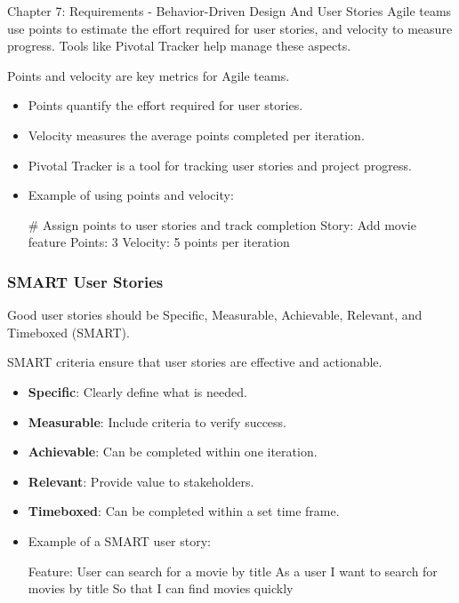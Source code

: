 \begin{notes}{Chapter 7: Requirements - Behavior-Driven Design And User Stories}
    Agile teams use points to estimate the effort required for user stories, and velocity to measure progress. Tools like Pivotal Tracker help manage these aspects.
    
    \begin{highlight}
    
        Points and velocity are key metrics for Agile teams.
        
        \begin{itemize}
            \item Points quantify the effort required for user stories.
            \item Velocity measures the average points completed per iteration.
            \item Pivotal Tracker is a tool for tracking user stories and project progress.
            \item Example of using points and velocity:
    \begin{code}[Bash]
    # Assign points to user stories and track completion
    Story: Add movie feature
    Points: 3
    Velocity: 5 points per iteration
    \end{code}
        \end{itemize}
    
    \end{highlight}
    
    \subsubsection*{SMART User Stories}
    
    Good user stories should be Specific, Measurable, Achievable, Relevant, and Timeboxed (SMART).
    
    \begin{highlight}
    
        SMART criteria ensure that user stories are effective and actionable.
        
        \begin{itemize}
            \item \textbf{Specific}: Clearly define what is needed.
            \item \textbf{Measurable}: Include criteria to verify success.
            \item \textbf{Achievable}: Can be completed within one iteration.
            \item \textbf{Relevant}: Provide value to stakeholders.
            \item \textbf{Timeboxed}: Can be completed within a set time frame.
            \item Example of a SMART user story:
    \begin{code}[Bash]
    Feature: User can search for a movie by title
    As a user
    I want to search for movies by title
    So that I can find movies quickly
    \end{code}
        \end{itemize}
    

\end{highlight}
\end{notes}
